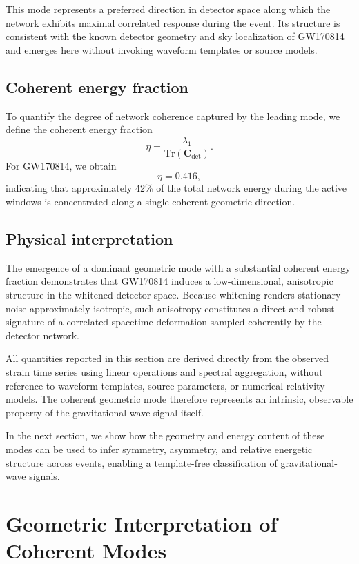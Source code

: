 \documentclass[11pt,a4paper]{article}
\begin{document}
This mode represents a preferred direction in detector space along which the network exhibits maximal correlated response during the event.
Its structure is consistent with the known detector geometry and sky localization of GW170814 and emerges here without invoking waveform templates or source models.

\subsection{Coherent energy fraction}

To quantify the degree of network coherence captured by the leading mode, we define the coherent energy fraction
\begin{equation}
\eta = \frac{\lambda_1}{\mathrm{Tr}(\mathbf{C}_{\mathrm{det}})}.
\end{equation}
For GW170814, we obtain
\[
\eta = 0.416,
\]
indicating that approximately 42\% of the total network energy during the active windows is concentrated along a single coherent geometric direction.

\subsection{Physical interpretation}

The emergence of a dominant geometric mode with a substantial coherent energy fraction demonstrates that GW170814 induces a low-dimensional, anisotropic structure in the whitened detector space.
Because whitening renders stationary noise approximately isotropic, such anisotropy constitutes a direct and robust signature of a correlated spacetime deformation sampled coherently by the detector network.

All quantities reported in this section are derived directly from the observed strain time series using linear operations and spectral aggregation, without reference to waveform templates, source parameters, or numerical relativity models.
The coherent geometric mode therefore represents an intrinsic, observable property of the gravitational-wave signal itself.

In the next section, we show how the geometry and energy content of these modes can be used to infer symmetry, asymmetry, and relative energetic structure across events, enabling a template-free classification of gravitational-wave signals.

\section{Geometric Interpretation of Coherent Modes}
\end{document}

